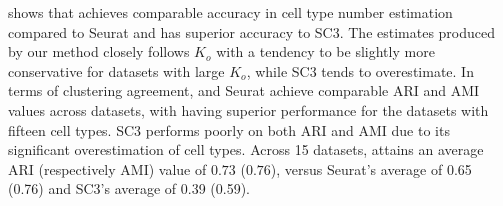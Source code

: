  shows that \methodname achieves comparable accuracy in cell type number estimation compared to Seurat and has superior accuracy to SC3. The estimates produced by our method closely follows $K_o$ with a tendency to be slightly more conservative for datasets with 
large $K_o$, while SC3 tends to overestimate. 
%
In terms of clustering agreement, \methodname and Seurat achieve comparable ARI and AMI values across datasets, 
with \methodname having superior performance for the datasets with fifteen cell types.
SC3 performs poorly on both ARI and AMI due to its significant overestimation of cell types. 
Across 15 datasets, \methodname attains an average ARI (respectively AMI) value of $0.73$ ($0.76$), 
versus Seurat's average of 0.65 (0.76) and SC3's average of 0.39 (0.59).
